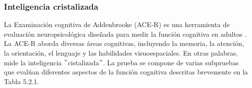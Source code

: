 \documentclass[11pt,letterpaper]{article}
\numberwithin{equation}{subsection}
\numberwithin{table}{subsection}
\begin{document}
\subsubsection{Inteligencia cristalizada}
\smallskip
\noindent La Examinación cognitiva de Addenbrooke (ACE-R) es una herramienta de evaluación neuropsicológica diseñada para medir la función cognitiva en adultos \cite{noone2015addenbrooke}. La ACE-R aborda diversas áreas cognitivas, incluyendo la memoria, la atención, la orientación, el lenguaje y las habilidades visuoespaciales. En otras palabras, mide la inteligencia $"$cistalizada$"$. La prueba se compone de varias subpruebas que evalúan diferentes aspectos de la función cognitiva descritas brevemente en la Tabla 5.2.1.

\begin{table}[H]
\captionsetup{labelfont=bf}
\caption{\scriptsize Batería de pruebas ACE-R}
\end{table}
\end{document}
